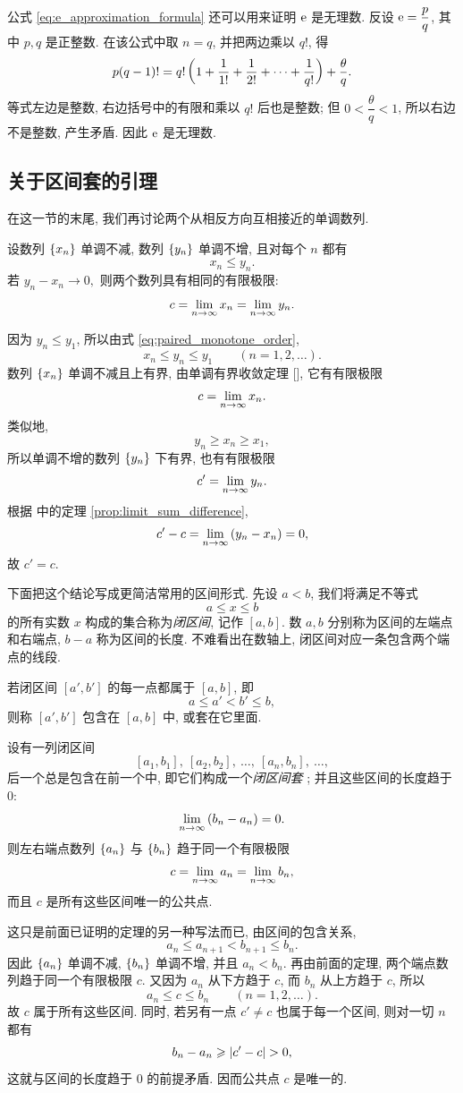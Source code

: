 公式 \eqref{eq:e_approximation_formula} 还可以用来证明 $\mathrm{e}$ 是无理数.
反设 $\mathrm{e}=\dfrac pq$, 其中 $p,q$ 是正整数. 在该公式中取 $n=q$,
并把两边乘以 $q!$, 得
$$
p(q-1)!=q!\left( 1+\frac1{1!}+\frac1{2!}+\cdots+\frac1{q!} \right)
+\frac{\theta}{q}.
$$
等式左边是整数, 右边括号中的有限和乘以 $q!$ 后也是整数;
但 $0<\dfrac{\theta}{q}<1$, 所以右边不是整数, 产生矛盾.
因此 $\mathrm{e}$ 是无理数.

\subsection{关于区间套的引理}\label{subsec:38}
在这一节的末尾, 我们再讨论两个从相反方向互相接近的单调数列.

{\kaishu 设数列 $\{x_{n}\}$ 单调不减, 数列 $\{y_{n}\}$ 单调不增,
且对每个 $n$ 都有
\begin{equation}\label{eq:paired_monotone_order}
x_n\leqslant y_n.
\end{equation}
若
$
y_n-x_n\to0,
$
则两个数列具有相同的有限极限:
$$
c=\lim\limits_{n \to \infty}x_n=\lim\limits_{n \to \infty}y_n.
$$}

因为 $y_n\leqslant y_1$, 所以由式 \eqref{eq:paired_monotone_order},
$$
x_n\leqslant y_n\leqslant y_1\qquad(n=1,2,\ldots).
$$
数列 $\{x_{n}\}$ 单调不减且上有界, 由单调有界收敛定理 [], 它有有限极限
$$
c=\lim\limits_{n \to \infty}x_n.
$$
类似地,
$$
y_n\geqslant x_n\geqslant x_1,
$$
所以单调不增的数列 $\{y_{n}\}$ 下有界, 也有有限极限
$$
c'=\lim\limits_{n \to \infty}y_n.
$$
根据  中的定理 \ref{prop:limit_sum_difference},
$$
c'-c=\lim\limits_{n \to \infty}\left( y_n-x_n \right)=0,
$$
故 $c'=c$.

下面把这个结论写成更简洁常用的区间形式.
先设 $a<b$,
我们将满足不等式
$$
a\leqslant x\leqslant b
$$
的所有实数 $x$ 构成的集合称为\emph{闭区间},
记作 $[a,b]$. 数 $a,b$ 分别称为区间的左端点和右端点,
$b-a$ 称为区间的长度.
不难看出在数轴上, 闭区间对应一条包含两个端点的线段.

若闭区间 $[a',b']$ 的每一点都属于 $[a,b]$, 即
$$
a\leqslant a'<b'\leqslant b,
$$
则称 $[a',b']$ 包含在 $[a,b]$ 中, 或套在它里面.

{\kaishu
设有一列闭区间
$$
[a_1,b_1],\ [a_2,b_2],\ \ldots,\ [a_n,b_n],\ \ldots,
$$
后一个总是包含在前一个中, 即它们构成一个\emph{闭区间套}
; 并且这些区间的长度趋于 $0$:
$$
\lim\limits_{n \to \infty}\left( b_n-a_n \right)=0.
$$
则左右端点数列 $\{a_{n}\}$ 与 $\{b_{n}\}$ 趋于同一个有限极限
$$
c=\lim\limits_{n \to \infty}a_n=\lim\limits_{n \to \infty}b_n,
$$
而且 $c$ 是所有这些区间唯一的公共点.
}

这只是前面已证明的定理的另一种写法而已, 由区间的包含关系,
$$
a_n\leqslant a_{n+1}<b_{n+1}\leqslant b_n.
$$
因此 $\{a_{n}\}$ 单调不减, $\{b_{n}\}$ 单调不增,
并且 $a_n<b_n$.
再由前面的定理, 两个端点数列趋于同一个有限极限 $c$.
又因为 $a_n$ 从下方趋于 $c$, 而 $b_n$ 从上方趋于 $c$, 所以
$$
a_n\leqslant c\leqslant b_n\qquad(n=1,2,\ldots).
$$
故 $c$ 属于所有这些区间.
同时, 若另有一点 $c'\neq c$ 也属于每一个区间,
则对一切 $n$ 都有
$$
b_n-a_n\geqslant\abs{c'-c}>0,
$$
这就与区间的长度趋于 $0$ 的前提矛盾.
因而公共点 $c$ 是唯一的.

